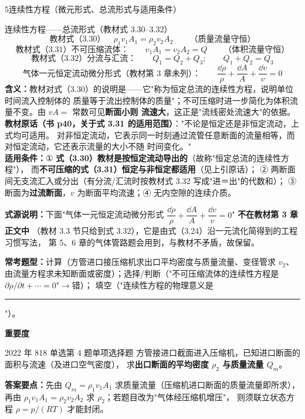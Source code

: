 \begin{kaodian}{5}{连续性方程（微元形式、总流形式与适用条件）}
\begin{gongshi}{连续性方程——总流形式（教材式 3.30--3.32）}
\[ \text{教材式（3.30）}\quad \rho_1 v_1 A_1=\rho_2 v_2 A_2\qquad\text{（质量流量守恒）} \]
\[ \text{教材式（3.31）不可压缩流体：}\qquad v_1 A_1=v_2 A_2=Q\qquad\text{（体积流量守恒）} \]
\[ \text{教材式（3.32）分流与汇流：}\qquad Q_1=Q_2+Q_3;\qquad Q_1+Q_2=Q_3 \]
\[ \text{气体一元恒定流动微分形式（教材第 3 章未列）：}\qquad \frac{\dd\rho}{\rho}+\frac{\dd A}{A}+\frac{\dd v}{v}=0 \]
\textbf{含义：}教材对式（3.30）的说明是——它"称为恒定总流的连续性方程，说明单位时间流入控制体的
质量等于流出控制体的质量"；不可压缩时进一步简化为体积流量不变。由 $vA=$ 常数可见\textbf{断面小则
流速大}，这正是"流线密处流速大"的依据。\\
\textbf{教材原话（书 p40，关于式 3.31 的适用范围）}："不论是恒定还是非恒定流动，上式均可适用。
对非恒定流动，它表示同一时刻通过流管任意断面的流量相等，而对恒定流动，它还表示流量的大小不随
时间变化。"\\
\textbf{适用条件：}① \textbf{式（3.30）教材是按恒定流动导出的}（故称"恒定总流的连续性方程"），
而\textbf{不可压缩的式（3.31）恒定与非恒定都适用}（见上引原话）；
② 两断面间无支流汇入或分出（有分流/汇流时按教材式 3.32 写成"进＝出"的代数和）；
③ 断面为\textbf{过流断面}，$v$ 为断面平均流速；④ 无内空隙的连续介质。
\end{gongshi}

\begin{tishi}
\textbf{式源说明：}下面"气体一元恒定流动微分形式
$\dfrac{\dd\rho}{\rho}+\dfrac{\dd A}{A}+\dfrac{\dd v}{v}=0$" \textbf{不在教材第 3 章正文中}
（教材 3.3 节只给到式 3.32），它是由式（3.24）沿一元流化简得到的工程习惯写法，
第 5、6 章的气体管路题会用到，与教材不矛盾，故保留。
\end{tishi}

\textbf{常考题型：}计算（方管进口接压缩机求出口平均密度与质量流量、变径管求 $v_2$、
由流量方程求未知断面或密度）；选择/判断（"不可压缩流体的连续性方程是 $\partial\rho/\partial t+\cdots=0$"$\to$错）；
填空（"连续性方程的物理意义是\rule{3cm}{0.4pt}"）。

\textbf{重要度 }\quad{}\quad{}

\begin{zhenti}{2022 年 818 单选第 4 题}{单项选择题}
方管接进口截面进入压缩机，已知进口断面的面积与流速（及进口空气密度），
求\textbf{出口断面的平均密度 $\rho_2$ 与质量流量 $Q_m$}。
\end{zhenti}
\noindent\textbf{答案要点：}先由 $Q_m=\rho_1 v_1 A_1$ 求质量流量（压缩机进口断面的质量流量即所求），
再由 $\rho_1 v_1 A_1=\rho_2 v_2 A_2$ 求 $\rho_2$；若题目改为"气体经压缩机增压"，
则须联立状态方程 $\rho=p/(RT)$ 才能封闭。


\end{kaodian}
